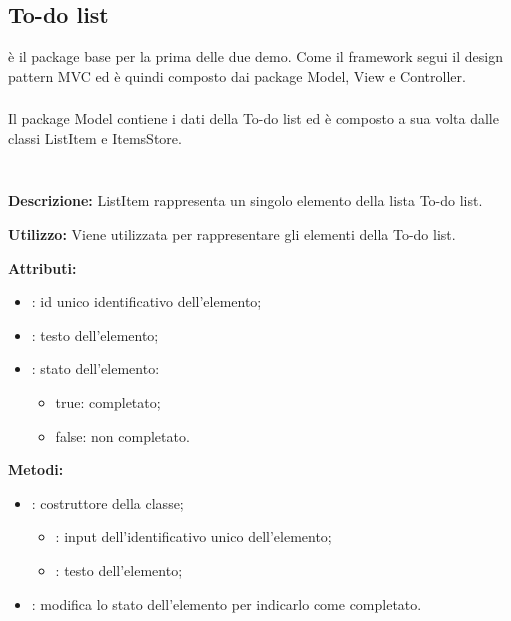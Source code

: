 \subsection{To-do list} \label{To-do list}
 è il package base per la prima delle due demo. Come il framework segui il design pattern MVC ed è quindi composto dai package Model, View e Controller.

\subsubsection[::Model]{\class} \label{\class}
Il package Model contiene i dati della To-do list ed è composto a sua volta dalle classi ListItem e ItemsStore.


\subparagraph[::ListItem]{\class}\mbox{}\\ \label{\class}
\textbf{Descrizione:}
ListItem rappresenta un singolo elemento della lista To-do list.

\textbf{Utilizzo:}
Viene utilizzata per rappresentare gli elementi della To-do list.

\textbf{Attributi:}
\begin{itemize}
	\item {}: id unico identificativo dell'elemento;
	\item {}: testo dell'elemento;
	\item {}: stato dell'elemento: 
	\begin{itemize}
		\item true: completato;
		\item false: non completato.
	\end{itemize}
\end{itemize}

\textbf{Metodi:}
\begin{itemize}
	\item {}: costruttore della classe;
	\begin{itemize}
		\item {}: input dell'identificativo unico dell'elemento;
		\item {}: testo dell'elemento;
	\end{itemize}
	\item {}: modifica lo stato dell'elemento per indicarlo come completato.
\end{itemize}

